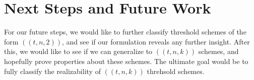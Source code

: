 \chapter{Next Steps and Future Work}
\label{ch4}

For our future steps, we would like to further classify threshold schemes of the form $((t,n,2))$, and see if our formulation reveals any further insight. After this, we would like to see if we can generalize to $((t,n,k))$ schemes, and hopefully prove properties about these schemes. The ultimate goal would be to fully classify the realizability of $((t,n,k))$ threhsold schemes. 